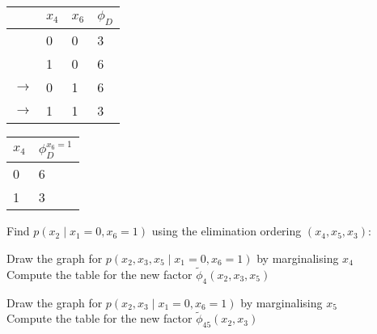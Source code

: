 \begin{exenumerate}
\begin{solution}
\begin{center}
    \end{center}

    \begin{center}
      \begin{tabular}{llll}
        \toprule
        & $x_4$ & $x_6$ & $\phi_D$\\
        \midrule
                      & 0 & 0 & 3 \\
                      & 1 & 0 & 6 \\
        $\rightarrow$ & 0 & 1 & 6 \\
        $\rightarrow$ & 1 & 1 & 3 \\
        \bottomrule
      \end{tabular}
      \hspace{3ex}  \hspace{3ex}
      \begin{tabular}{ll}
        \toprule
        $x_4$ & $\phi_D^{x_6=1}$\\
        \midrule
        0 & 6 \\
        1 & 3 \\
        \bottomrule
      \end{tabular}
    \end{center}

  \end{solution}

  \item Find $p(x_2 \mid x_1=0, x_6=1)$ using the elimination ordering $(x_4, x_5, x_3)$:

  \begin{exenumerate}
    \item Draw the graph for $p(x_2, x_3, x_5 \mid x_1=0, x_6=1)$ by marginalising $x_4$ \\
    Compute the table for the new factor $\tilde{\phi}_4(x_2, x_3, x_5)$ \\

    \item Draw the graph for $p(x_2, x_3 \mid x_1=0, x_6=1)$ by marginalising $x_5$ \\
    Compute the table for the new factor $\tilde{\phi}_{45}(x_2, x_3)$ \\


\end{exenumerate}
\end{exenumerate}
